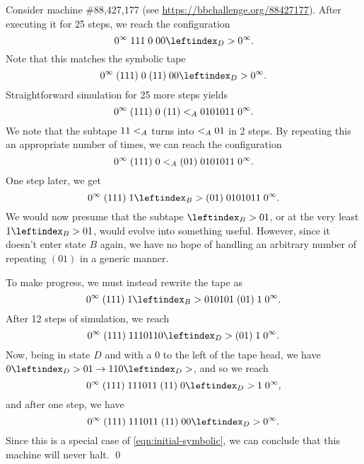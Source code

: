 \begin{example}
Consider machine \#88,427,177 (see \url{https://bbchallenge.org/88427177}).
After executing it for 25 steps, we reach the configuration
\begin{equation}
    0^\infty\; 111\; 0\; 00 \rhead D 0^\infty.
\end{equation}
Note that this matches the symbolic tape
\begin{equation}
    \label{eqn:initial-symbolic}
    0^\infty\; (111)\; 0\; (11)\; 00 \rhead D 0^\infty.
\end{equation}
Straightforward simulation for 25 more steps yields
\begin{equation}
    0^\infty\; (111)\; 0\; (11) <_A 0101011\; 0^\infty.
\end{equation}
We note that the subtape $11 <_A$ turns into $<_A 01$ in 2 steps. By repeating
this an appropriate number of times, we can reach the configuration
\begin{equation}
    0^\infty\; (111)\; 0 <_A (01)\; 0101011\; 0^\infty.
\end{equation}
One step later, we get
\begin{equation}
    0^\infty\; (111)\; 1 \rhead B (01)\; 0101011\; 0^\infty.
\end{equation}
We would now presume that the subtape $\rhead B 01$, or at the very least $1 \rhead B 01$,
would evolve into something
useful. However, since it doesn't enter state $B$ again, we have no hope of
handling an arbitrary number of repeating $(01)$ in a generic manner.

To make progress, we must instead rewrite the tape as
\begin{equation}
    0^\infty\; (111)\; 1 \rhead B 010101\; (01)\; 1\; 0^\infty.
\end{equation}
After 12 steps of simulation, we reach
\begin{equation}
    0^\infty\; (111)\; 1110110 \rhead D (01)\; 1\; 0^\infty.
\end{equation}
Now, being in state $D$ and with a 0 to the left of the tape head, we have
$0 \rhead D 01 \rightarrow 110 \rhead D$, and so we reach
\begin{equation}
    0^\infty\; (111)\; 111011\; (11)\; 0 \rhead D 1\; 0^\infty,
\end{equation}
and after one step, we have
\begin{equation}
    0^\infty\; (111)\; 111011\; (11)\; 00 \rhead D 0^\infty.
\end{equation}
Since this is a special case of \eqref{eqn:initial-symbolic}, we can
conclude that this machine will never halt. \qed

\end{example}

